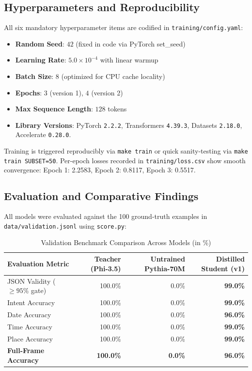 \documentclass[10pt,a4paper]{article}
\begin{document}
\subsection{Hyperparameters and Reproducibility}
All six mandatory hyperparameter items are codified in \texttt{training/config.yaml}:
\begin{itemize}\setlength\itemsep{0em}
    \item \textbf{Random Seed}: $42$ (fixed in code via PyTorch set\_seed)
    \item \textbf{Learning Rate}: $5.0 \times 10^{-4}$ with linear warmup
    \item \textbf{Batch Size}: $8$ (optimized for CPU cache locality)
    \item \textbf{Epochs}: $3$ (version 1), $4$ (version 2)
    \item \textbf{Max Sequence Length}: $128$ tokens
    \item \textbf{Library Versions}: PyTorch \texttt{2.2.2}, Transformers \texttt{4.39.3}, Datasets \texttt{2.18.0}, Accelerate \texttt{0.28.0}.
\end{itemize}

Training is triggered reproducibly via \texttt{make train} or quick sanity-testing via \texttt{make train SUBSET=50}. Per-epoch losses recorded in \texttt{training/loss.csv} show smooth convergence: Epoch 1: 2.2583, Epoch 2: 0.8117, Epoch 3: 0.5517.

\subsection{Evaluation and Comparative Findings}
All models were evaluated against the 100 ground-truth examples in \texttt{data/validation.jsonl} using \texttt{score.py}:

\begin{table}[h!]
\centering
\small
\caption{Validation Benchmark Comparison Across Models (in \%)}
\begin{tabular}{lrrr}
\toprule
\textbf{Evaluation Metric} & \textbf{Teacher (Phi-3.5)} & \textbf{Untrained Pythia-70M} & \textbf{Distilled Student (v1)} \\
\midrule
JSON Validity ($\ge 95\%$ gate) & 100.0\% & 0.0\% & \textbf{99.0\%} \\
Intent Accuracy & 100.0\% & 0.0\% & \textbf{99.0\%} \\
Date Accuracy & 100.0\% & 0.0\% & \textbf{96.0\%} \\
Time Accuracy & 100.0\% & 0.0\% & \textbf{99.0\%} \\
Place Accuracy & 100.0\% & 0.0\% & \textbf{99.0\%} \\
\midrule
\textbf{Full-Frame Accuracy} & \textbf{100.0\%} & \textbf{0.0\%} & \textbf{96.0\%} \\
\bottomrule
\end{tabular}
\end{table}
\end{document}
